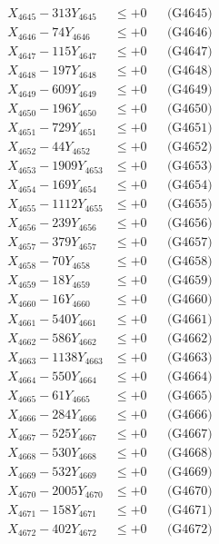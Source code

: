 \documentclass[a4paper,10pt]{article}
\begin{document}
{\begin{align}
X_{4645} - 313Y_{4645} &\leq +0 && \text{(G4645)} \\
X_{4646} - 74Y_{4646} &\leq +0 && \text{(G4646)} \\
X_{4647} - 115Y_{4647} &\leq +0 && \text{(G4647)} \\
X_{4648} - 197Y_{4648} &\leq +0 && \text{(G4648)} \\
X_{4649} - 609Y_{4649} &\leq +0 && \text{(G4649)} \\
X_{4650} - 196Y_{4650} &\leq +0 && \text{(G4650)} \\
\allowbreak
X_{4651} - 729Y_{4651} &\leq +0 && \text{(G4651)} \\
X_{4652} - 44Y_{4652} &\leq +0 && \text{(G4652)} \\
X_{4653} - 1909Y_{4653} &\leq +0 && \text{(G4653)} \\
X_{4654} - 169Y_{4654} &\leq +0 && \text{(G4654)} \\
X_{4655} - 1112Y_{4655} &\leq +0 && \text{(G4655)} \\
X_{4656} - 239Y_{4656} &\leq +0 && \text{(G4656)} \\
X_{4657} - 379Y_{4657} &\leq +0 && \text{(G4657)} \\
X_{4658} - 70Y_{4658} &\leq +0 && \text{(G4658)} \\
X_{4659} - 18Y_{4659} &\leq +0 && \text{(G4659)} \\
X_{4660} - 16Y_{4660} &\leq +0 && \text{(G4660)} \\
\allowbreak
X_{4661} - 540Y_{4661} &\leq +0 && \text{(G4661)} \\
X_{4662} - 586Y_{4662} &\leq +0 && \text{(G4662)} \\
X_{4663} - 1138Y_{4663} &\leq +0 && \text{(G4663)} \\
X_{4664} - 550Y_{4664} &\leq +0 && \text{(G4664)} \\
X_{4665} - 61Y_{4665} &\leq +0 && \text{(G4665)} \\
X_{4666} - 284Y_{4666} &\leq +0 && \text{(G4666)} \\
X_{4667} - 525Y_{4667} &\leq +0 && \text{(G4667)} \\
X_{4668} - 530Y_{4668} &\leq +0 && \text{(G4668)} \\
X_{4669} - 532Y_{4669} &\leq +0 && \text{(G4669)} \\
X_{4670} - 2005Y_{4670} &\leq +0 && \text{(G4670)} \\
\allowbreak
X_{4671} - 158Y_{4671} &\leq +0 && \text{(G4671)} \\
X_{4672} - 402Y_{4672} &\leq +0 && \text{(G4672)} \\

\end{align}}
\end{document}
